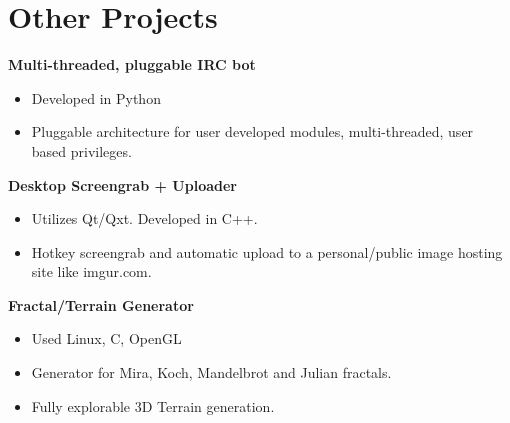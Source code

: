 \documentclass{article}
\begin{document}
\begin{minipage}[c]{0.6\textwidth}
\begin{description}
\end{description}

\section*{{\color{green} Other Projects}}

\begin{description}

\item {\bfseries Multi-threaded, pluggable IRC bot}
\begin{itemize}\addtolength{\itemsep}{-0.4\baselineskip}
\item Developed in Python
\item Pluggable architecture for user developed modules, multi-threaded, user based privileges.
\end{itemize}

\item {\bfseries Desktop Screengrab + Uploader}
\begin{itemize}\addtolength{\itemsep}{-0.4\baselineskip}
\item Utilizes Qt/Qxt. Developed in C++.
\item Hotkey screengrab and automatic upload to a personal/public image hosting site like
imgur.com.
\end{itemize}

\item {\bfseries Fractal/Terrain Generator}
\begin{itemize}\addtolength{\itemsep}{-0.4\baselineskip}
\item Used Linux, C, OpenGL
\item Generator for Mira, Koch, Mandelbrot and Julian fractals.
\item Fully explorable 3D Terrain generation.
\end{itemize}

\end{description}

\end{minipage}
\end{document}
